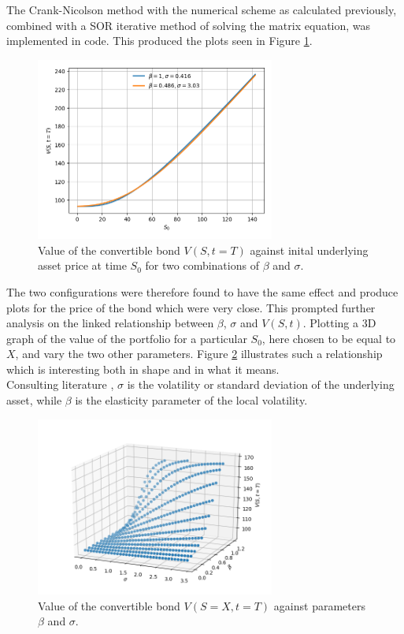 \documentclass{article}
\begin{document}
The Crank-Nicolson method with the numerical scheme as calculated previously, combined with a SOR iterative method of solving the matrix equation, was implemented in code.
This produced the plots seen in Figure \ref{fig:varying_s}.
\clearpage
\begin{figure}[!th]
\includegraphics[width=0.7\textwidth,center]{../images/european_varying_s.png}
\caption{Value of the convertible bond $V(S,t=T)$ against inital underlying asset price at time $S_0$ for two combinations of $\beta$ and $\sigma$.}
\label{fig:varying_s}
\end{figure}
The two configurations were therefore found to have the same effect and produce plots for the price of the bond which were very close.
This prompted further analysis on the linked relationship between $\beta$, $\sigma$ and $V(S,t)$.
Plotting a 3D graph of the value of the portfolio for a particular $S_0$, here chosen to be equal to $X$, and vary the two other parameters.
Figure \ref{fig:3d_relationship} illustrates such a relationship which is interesting both in shape and in what it means.
\\
Consulting literature \cite{cev}, $\sigma$ is the volatility or standard deviation of the underlying asset, while $\beta$ is the elasticity parameter of the local volatility.
\begin{figure}[!bh]
\includegraphics[width=0.7\textwidth,center]{../images/3d_european_varying_s_varying_sigma_varying_beta.png}
\caption{Value of the convertible bond $V(S=X,t=T)$ against parameters $\beta$ and $\sigma$.}
\label{fig:3d_relationship}
\end{figure}
\clearpage


\clearpage
\end{document}
